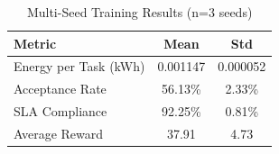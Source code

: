
\begin{table}[h]
\centering
\caption{Multi-Seed Training Results (n=3 seeds)}
\label{tab:multi_seed}
\begin{tabular}{lcc}
\toprule
\textbf{Metric} & \textbf{Mean} & \textbf{Std} \\
\midrule
Energy per Task (kWh) & 0.001147 & 0.000052 \\
Acceptance Rate & 56.13\% & 2.33\% \\
SLA Compliance & 92.25\% & 0.81\% \\
Average Reward & 37.91 & 4.73 \\
\bottomrule
\end{tabular}
\end{table}
